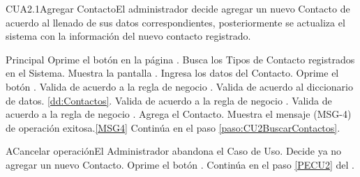 	\begin{UseCase}{CUA2.1}{Agregar Contacto}{El administrador decide agregar un nuevo Contacto de acuerdo al llenado de sus datos correspondientes, posteriormente se actualiza el sistema con la información del nuevo contacto registrado.}
	\end{UseCase}

	\begin{UCtrayectoria}{Principal}
			\UCpaso[\UCactor] Oprime el botón  en la página .
                        \UCpaso Busca los Tipos de Contacto registrados en el Sistema.
			\UCpaso Muestra la pantalla .
		        \UCpaso [\UCactor] Ingresa los datos del Contacto.\label{paso:CU2ValidacionDatosNuevosContactos} 
                	\UCpaso [\UCactor] Oprime el botón .\label{PECU5}
                        \UCpaso Valida de acuerdo a la regla de negocio .  
                        \UCpaso Valida de acuerdo al diccionario de datos.  \ref{dd:Contactos}. 
                        \UCpaso Valida de acuerdo a la regla de negocio . 
			\UCpaso Valida de acuerdo a la regla de negocio . 
			\UCpaso Agrega el Contacto.
			\UCpaso Muestra el mensaje (MSG-4) de operación exitosa.\ref{MSG4}
			\UCpaso Continúa en el paso \ref{paso:CU2BuscarContactos}.
	\end{UCtrayectoria}

	\begin{UCtrayectoriaA}{A}{Cancelar operación}{El Administrador abandona el Caso de Uso.}
			\UCpaso[\UCactor] Decide ya no agregar un nuevo Contacto.
			\UCpaso[\UCactor] Oprime el botón .
			\UCpaso Continúa en el paso \ref{PECU2} del .
	\end{UCtrayectoriaA}

